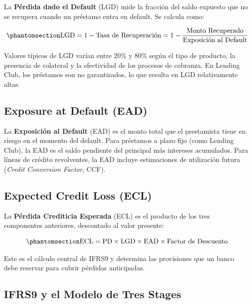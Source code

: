 \documentclass[
  spanish,
  11pt,
  letterpaper,
]{scrbook}
\theoremstyle{plain}
\theoremstyle{remark}
\begin{document}
La \textbf{Pérdida dado el Default} (LGD) mide la fracción del saldo
expuesto que no se recupera cuando un préstamo entra en default. Se
calcula como:

\begin{equation}\protect\phantomsection\label{eq-lgd}{
\text{LGD} = 1 - \text{Tasa de Recuperación} = 1 - \frac{\text{Monto Recuperado}}{\text{Exposición al Default}}
}\end{equation}

Valores típicos de LGD varían entre 20\% y 80\% según el tipo de
producto, la presencia de colateral y la efectividad de los procesos de
cobranza. En Lending Club, los préstamos son no garantizados, lo que
resulta en LGD relativamente altas.

\subsection{Exposure at Default (EAD)}\label{exposure-at-default-ead}

La \textbf{Exposición al Default} (EAD) es el monto total que el
prestamista tiene en riesgo en el momento del default. Para préstamos a
plazo fijo (como Lending Club), la EAD es el saldo pendiente del
principal más intereses acumulados. Para líneas de crédito revolventes,
la EAD incluye estimaciones de utilización futura (\emph{Credit
Conversion Factor}, CCF).

\subsection{Expected Credit Loss (ECL)}\label{expected-credit-loss-ecl}

La \textbf{Pérdida Crediticia Esperada} (ECL) es el producto de los tres
componentes anteriores, descontado al valor presente:

\begin{equation}\protect\phantomsection\label{eq-ecl}{
\text{ECL} = \text{PD} \times \text{LGD} \times \text{EAD} \times \text{Factor de Descuento}
}\end{equation}

Este es el cálculo central de IFRS9 y determina las provisiones que un
banco debe reservar para cubrir pérdidas anticipadas.

\subsection{IFRS9 y el Modelo de Tres
Stages}\label{ifrs9-y-el-modelo-de-tres-stages}
\end{document}
